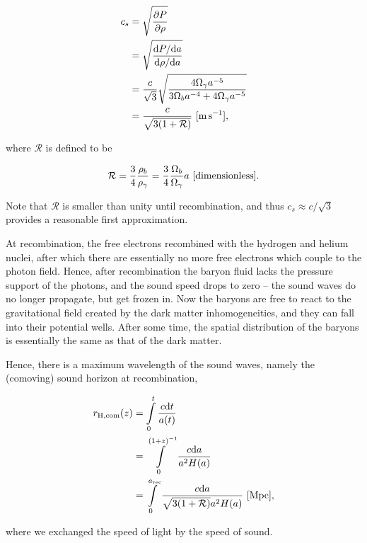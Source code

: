 \documentclass[a4paper,11pt]{article}
\begin{document}
\begin{align*}
    c_s &= \sqrt{\frac{\partial P}{\partial\rho}} \\
        &= \sqrt{\frac{\mathrm{d}P/\mathrm{d}a}{\mathrm{d}\rho/\mathrm{d}a}} \\
        &= \frac{c}{\sqrt{3}}\sqrt{\frac{4\Omega_\gamma a^{-5}}{3\Omega_ba^{-4}+4\Omega_\gamma a^{-5}}} \\
        &= \frac{c}{\sqrt{3(1+\mathcal{R})}} ~ [{\rm m\,s^{-1}}],
\end{align*}

{\noindent}where $\mathcal{R}$ is defined to be

\begin{align*}
    \mathcal{R} = \frac{3}{4}\frac{\rho_b}{\rho_\gamma} = \frac{3}{4}\frac{\Omega_b}{\Omega_\gamma}a ~ [{\rm dimensionless}].
\end{align*}

{\noindent}Note that $\mathcal{R}$ is smaller than unity until recombination, and thus $c_s\approx c/\sqrt{3}$ provides a reasonable first approximation.

{\noindent}At recombination, the free electrons recombined with the hydrogen and helium nuclei, after which there are essentially no more free electrons which couple to the photon field. Hence, after recombination the baryon fluid lacks the pressure support of the photons, and the sound speed drops to zero -- the sound waves do no longer propagate, but get frozen in. Now the baryons are free to react to the gravitational field created by the dark matter inhomogeneities, and they can fall into their potential wells. After some time, the spatial distribution of the baryons is essentially the same as that of the dark matter.

{\noindent}Hence, there is a maximum wavelength of the sound waves, namely the (comoving) sound horizon at recombination,

\begin{align*}
    r_\mathrm{H,com}(z) &= \int\limits_0^t \frac{c\mathrm{d}t}{a(t)} \\ 
    &= \int\limits_0^{(1+z)^{-1}} \frac{c\mathrm{d}a}{a^2H(a)} \\
    &= \int\limits_0^{a_\mathrm{rec}} \frac{c\mathrm{d}a}{\sqrt{3(1+\mathcal{R})}a^2H(a)} ~ [{\rm Mpc}],
\end{align*}

{\noindent}where we exchanged the speed of light by the speed of sound.
\end{document}
